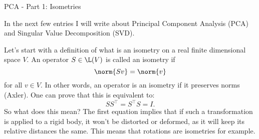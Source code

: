 \begin{entry}[2]{PCA - Part 1: Isometries }

\begin{entrysection}
In the next few entries I will write about Principal Component Analysis (PCA) and Singular Value Decomposition (SVD).
\end{entrysection}

\begin{entrysection}
Let's start with a definition of what is an isometry on a real finite dimensional space $V$. An operator $S \in \L(V)$ is called an isometry if 
\[ \norm{Sv} = \norm{v} \]
for all $v \in V$. In other words, an operator is an isometry if it preserves norms (Axler). One can prove that this is equivalent to:
\[ SS^{\intercal} = S^{\intercal}S = I. \]
So what does this mean? The first equation implies that if such a transformation is applied to a rigid body, it won't be distorted or deformed, as it will keep its relative distances the same. This means that rotations are isometries for example.\\


\end{entrysection}
\end{entry}
